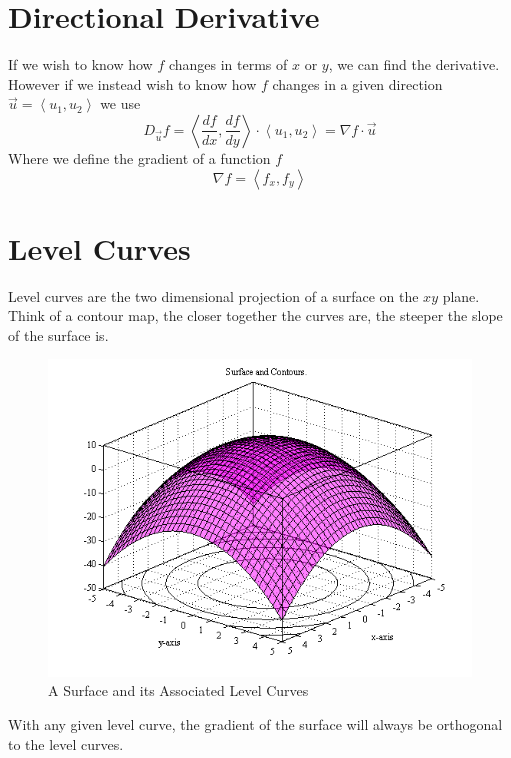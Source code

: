 \documentclass{article}
\newcommand{\nvec}[1]{\left\langle #1 \right\rangle}
\begin{document}
\section{Directional Derivative}
If we wish to know how $f$ changes in terms of $x$ or $y$, we can find the derivative. However if we instead wish to know how $f$ changes in a given direction $\vec{u} = \nvec{u_1, u_2}$ we use
\begin{equation}
D_{\vec{u}}f = \nvec{\frac{df}{dx}, \frac{df}{dy}} \cdot \nvec{u_1, u_2} = \nabla f \cdot \vec{u}
\end{equation}
Where we define the gradient of a function $f$
\begin{equation}
\nabla f = \nvec{f_x, f_y}
\end{equation}
\section{Level Curves}
Level curves are the two dimensional projection of a surface on the $xy$ plane. Think of a contour map, the closer together the curves are, the steeper the slope of the surface is.
\begin{figure}[h]
\centering
    \includegraphics[scale=0.5]{levelcurve.png}
    \caption{A Surface and its Associated Level Curves}
\end{figure}
With any given level curve, the gradient of the surface will always be orthogonal to the level curves.
\end{document}
